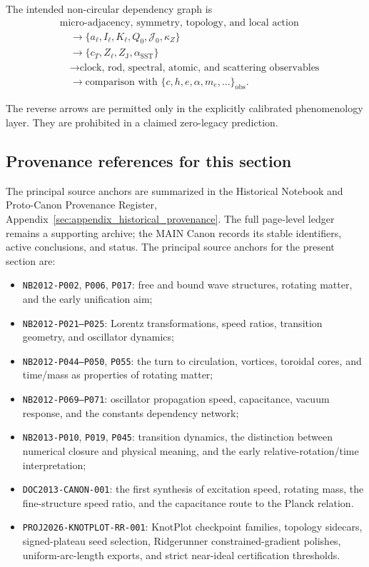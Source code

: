 \documentclass[11pt]{article}
\theoremstyle{definition}
\theoremstyle{plain}
\theoremstyle{remark}
\begin{document}
The intended non-circular dependency graph is
\begin{align}
    &\text{micro-adjacency, symmetry, topology, and local action}
    \nonumber\\
    &\quad\longrightarrow
    \{a_\ell,I_\ell,K_\ell,Q_0,\mathcal J_0,\kappa_Z\}
    \nonumber\\
    &\quad\longrightarrow
    \{c_T,Z_\ell,Z_{\mathrm J},\alpha_{\mathrm{SST}}\}
    \nonumber\\
    &\quad\longrightarrow
    \text{clock, rod, spectral, atomic, and scattering observables}
    \nonumber\\
    &\quad\longrightarrow
    \text{comparison with }\{c,h,e,\alpha,m_e,\ldots\}_{\mathrm{obs}}.
    \label{eq:canonical_zero_legacy_dependency_graph}
\end{align}

The reverse arrows are permitted only in the explicitly calibrated
phenomenology layer. They are prohibited in a claimed zero-legacy prediction.

\subsection{Provenance references for this section}
\label{subsec:genesis_provenance_references}

The principal source anchors are summarized in the Historical Notebook and
Proto-Canon Provenance Register, Appendix~\ref{sec:appendix_historical_provenance}.
The full page-level ledger remains a supporting archive; the MAIN Canon records
its stable identifiers, active conclusions, and status. The principal source
anchors for the present section are:
\begin{itemize}
    \item \texttt{NB2012-P002}, \texttt{P006}, \texttt{P017}: free and bound
    wave structures, rotating matter, and the early unification aim;
    \item \texttt{NB2012-P021--P025}: Lorentz transformations, speed ratios,
    transition geometry, and oscillator dynamics;
    \item \texttt{NB2012-P044--P050}, \texttt{P055}: the turn to circulation,
    vortices, toroidal cores, and time/mass as properties of rotating matter;
    \item \texttt{NB2012-P069--P071}: oscillator propagation speed,
    capacitance, vacuum response, and the constants dependency network;
    \item \texttt{NB2013-P010}, \texttt{P019}, \texttt{P045}: transition
    dynamics, the distinction between numerical closure and physical meaning,
    and the early relative-rotation/time interpretation;
    \item \texttt{DOC2013-CANON-001}: the first synthesis of excitation speed,
    rotating mass, the fine-structure speed ratio, and the capacitance route to
    the Planck relation.
    \item \texttt{PROJ2026-KNOTPLOT-RR-001}: KnotPlot checkpoint
    families, topology sidecars, signed-plateau seed selection, Ridgerunner
    constrained-gradient polishes, uniform-arc-length exports, and strict
    near-ideal certification thresholds.
\end{itemize}
\end{document}
